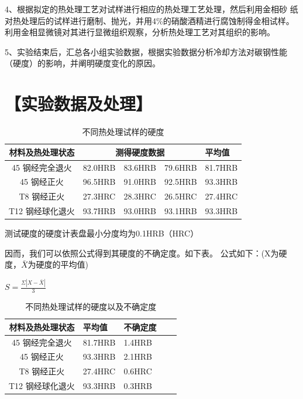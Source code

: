 \documentclass[a4paper,utf8]{article}
\begin{document}
4、根据拟定的热处理工艺对试样进行相应的热处理工艺处理，然后利用金相砂
纸对热处理后的试样进行磨制、抛光，并用4\%的硝酸酒精进行腐蚀制得金相试样。
利用金相显微镜对其进行显微组织观察，分析热处理工艺对其组织的影响。

5、实验结束后，汇总各小组实验数据，根据实验数据分析冷却方法对碳钢性能（硬度）的影响，并阐明硬度变化的原因。

\newpage

\section*{【实验数据及处理】}

\begin{table}[!ht]\centering
    \caption{不同热处理试样的硬度}
    \extrarowheight=11pt
    \begin{tabularx}{\textwidth}{|c|X|X|X|X|}\hline
        材料及热处理状态 & \multicolumn{3}{c|}{测得硬度数据} & \hfil 平均值 \hfil \\[10pt] \hline
        45 钢经完全退火 & 82.0HRB & 83.6HRB & 79.6HRB & 81.7HRB \\[10pt] \hline
        45 钢经正火 & 96.5HRB & 91.0HRB & 92.5HRB & 93.3HRB \\[10pt] \hline
        T8 钢经正火 & 27.3HRC & 28.3HRC &26.5HRC  & 27.4HRC \\[10pt] \hline
        T12 钢经球化退火 & 93.7HRB & 93.0HRB &93.1HRB  & 93.3HRB \\[10pt] \hline
    \end{tabularx}
\end{table}

测试硬度的硬度计表盘最小分度均为0.1HRB（HRC）

因而，我们可以依照公式得到其硬度的不确定度。如下表。
公式如下：(X为硬度，$\bar{X} $为硬度的平均值)
\begin{center}
    $ S = \frac{\Sigma |X - \bar{X}| }{3} $
\end{center}

\begin{table}[!ht]\centering
    \caption{不同热处理试样的硬度以及不确定度}
    \extrarowheight=11pt
    \begin{tabularx}{\textwidth}{|c|X|X|X|X|}\hline
        材料及热处理状态  & \hfil 平均值 & \hfil 不确定度  \\[10pt] \hline
        45 钢经完全退火 & \hfil 81.7HRB &\hfil1.4HRB \\[10pt] \hline
        45 钢经正火  & \hfil 93.3HRB & \hfil2.1HRB \\[10pt] \hline
        T8 钢经正火  & \hfil 27.4HRC &\hfil0.6HRC \\[10pt] \hline
        T12 钢经球化退火 & \hfil 93.3HRB &\hfil0.3HRB \\[10pt] \hline
    \end{tabularx}
\end{table}
\end{document}
